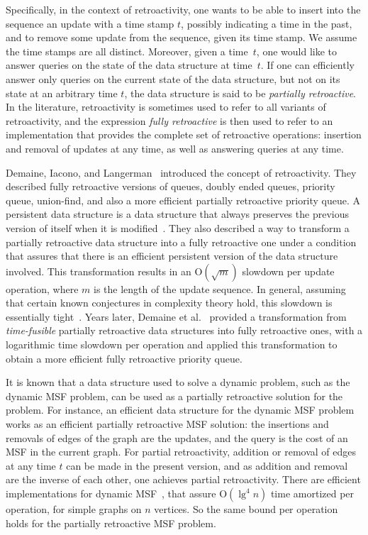 \documentclass[3p,times,procedia]{elsarticle}
\newcommand{\Oh}{\mathrm{O}}
\begin{document}
Specifically, in the context of retroactivity, one wants to be able to insert into 
the sequence an update with a time stamp $t$, possibly indicating a time in the past, 
and to remove some update from the sequence, given its time stamp.
We assume the time stamps are all distinct.  Moreover, given a time~$t$, 
one would like to answer queries on the state of the data structure at time~$t$. 
If one can efficiently answer only queries on the current state of the data structure, 
but not on its state at an arbitrary time $t$, the data structure is said to be 
\emph{partially retroactive}.  In the literature, retroactivity is sometimes used 
to refer to all variants of retroactivity, and the expression \emph{fully retroactive}
is then used to refer to an implementation that provides the complete set of retroactive
operations: insertion and removal of updates at any time, as well as answering queries 
at any time. 

Demaine, Iacono, and Langerman~\cite{DemaineIL2007} introduced the concept of retroactivity. 
They described fully retroactive versions of queues, doubly ended queues, priority 
queue, union-find, and also a more efficient partially retroactive priority queue.
A persistent data structure is a data structure that always preserves the 
previous version of itself when it is modified~\cite{DriscollSST1989}.
They also described a way to transform a partially retroactive data structure 
into a fully retroactive one under a condition that assures that there is 
an efficient persistent version of the data structure involved.  
This transformation results in an $\Oh(\sqrt{m})$ 
slowdown per update operation, where $m$ is the length of the update sequence.
In general, assuming that certain known conjectures in complexity theory hold, 
this slowdown is essentially tight~\cite{ChenDGWXY2018}.
Years later, Demaine et al.~\cite{DemaineKLSY2015} provided a transformation 
from \emph{time-fusible} partially retroactive data structures into fully
retroactive ones, with a logarithmic time slowdown per operation and applied
this transformation to obtain a more efficient fully retroactive priority queue.

It is known that a data structure used to solve a dynamic problem, such as the 
dynamic MSF problem, can be used as a partially retroactive solution for the problem.  
For instance, an efficient data structure for the dynamic MSF problem works as an 
efficient partially retroactive MSF solution: the insertions and removals of edges 
of the graph are the updates, and the query is the cost of an MSF in the current graph.  
For partial retroactivity, addition or removal of edges at any time $t$ can be made 
in the present version, and as addition and removal are the inverse of each other, 
one achieves partial retroactivity.  
There are efficient implementations for dynamic MSF~\cite{HolmLT2001,HolmRWN2015}, 
that assure $\Oh(\lg^4 n)$ time amortized per operation, for simple graphs on $n$ vertices. 
So the same bound per operation holds for the partially retroactive MSF problem. 
\end{document}
